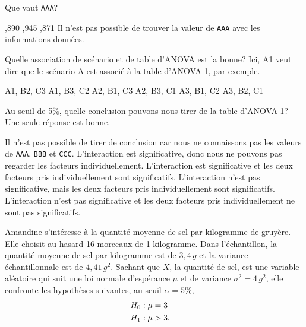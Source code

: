 \begin{questions}
\question[3]\label{mise1} Que vaut \texttt{AAA}?
\begin{checkboxes}
    ,890
    ,945
    ,871
    \choice Il n'est pas possible de trouver la valeur de \texttt{AAA} avec les informations données.
\end{checkboxes}

\vspace{0.5cm}
\question[3] \label{mise2} Quelle association de scénario et de table d'ANOVA est la bonne? Ici, A1 veut dire que le scénario A est associé à la table d'ANOVA 1, par exemple.

\begin{oneparcheckboxes}
    \choice A1, B2, C3
    \choice A1, B3, C2
    \choice A2, B1, C3
    \correctchoice A2, B3, C1
    \choice A3, B1, C2
    \choice A3, B2, C1
\end{oneparcheckboxes}

\vspace{0.5cm}
\question[3]\label{mise3} Au seuil de 5\%, quelle conclusion pouvons-nous tirer de la table d'ANOVA 1? Une seule réponse est bonne.
\begin{checkboxes}
    \choice Il n'est pas possible de tirer de conclusion car nous ne connaissons pas les valeurs de \texttt{AAA}, \texttt{BBB} et \texttt{CCC}.
    \choice L'interaction est significative, donc nous ne pouvons pas regarder les facteurs individuellement.
    \choice L'interaction est significative et les deux facteurs pris individuellement sont significatifs.
    \correctchoice L'interaction n'est pas significative, mais les deux facteurs pris individuellement sont significatifs.
    \choice L'interaction n'est pas significative et les deux facteurs pris individuellement ne sont pas significatifs.
\end{checkboxes}

\newpage

 \question\label{1FQCM}

Amandine s'intéresse à la quantité moyenne de sel par kilogramme de gruyère. Elle choisit au hasard 16 morceaux de 1 kilogramme. Dans l'échantillon, la quantité moyenne de sel par kilogramme est de $3,4 \,g$ et la variance échantillonnale est de $4,41 \, g^2$. Sachant que $X$, la quantité de sel, est une variable aléatoire qui suit une loi normale d'espérance $\mu$ et de variance $\sigma^2=4 \, g^2$, elle confronte les hypothèses suivantes, au seuil $\alpha=5\%$,
\begin{align*}
	H_0 &: \mu = 3 \cr
	H_1 &: \mu > 3.
\end{align*}


\end{questions}
